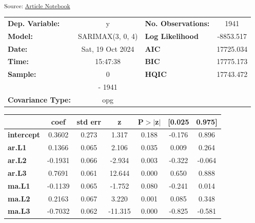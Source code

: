 \documentclass[
  number,
  preprint,
  3p,
  onecolumn]{elsarticle}
\begin{document}
\textsubscript{Source:
\href{https://iancont.github.io/fixed_income_garch/index.qmd.html}{Article
Notebook}}

\begin{center}
\begin{tabular}{lclc}
\toprule
\textbf{Dep. Variable:}          &        y         & \textbf{  No. Observations:  } &    1941     \\
\textbf{Model:}                  & SARIMAX(3, 0, 4) & \textbf{  Log Likelihood     } & -8853.517   \\
\textbf{Date:}                   & Sat, 19 Oct 2024 & \textbf{  AIC                } & 17725.034   \\
\textbf{Time:}                   &     15:47:38     & \textbf{  BIC                } & 17775.173   \\
\textbf{Sample:}                 &        0         & \textbf{  HQIC               } & 17743.472   \\
\textbf{}                        &      - 1941      & \textbf{                     } &             \\
\textbf{Covariance Type:}        &       opg        & \textbf{                     } &             \\
\bottomrule
\end{tabular}
\begin{tabular}{lcccccc}
                   & \textbf{coef} & \textbf{std err} & \textbf{z} & \textbf{P$> |$z$|$} & \textbf{[0.025} & \textbf{0.975]}  \\
\midrule
\textbf{intercept} &       0.3602  &        0.273     &     1.317  &         0.188        &       -0.176    &        0.896     \\
\textbf{ar.L1}     &       0.1366  &        0.065     &     2.106  &         0.035        &        0.009    &        0.264     \\
\textbf{ar.L2}     &      -0.1931  &        0.066     &    -2.934  &         0.003        &       -0.322    &       -0.064     \\
\textbf{ar.L3}     &       0.7691  &        0.061     &    12.644  &         0.000        &        0.650    &        0.888     \\
\textbf{ma.L1}     &      -0.1139  &        0.065     &    -1.752  &         0.080        &       -0.241    &        0.014     \\
\textbf{ma.L2}     &       0.2163  &        0.067     &     3.220  &         0.001        &        0.085    &        0.348     \\
\textbf{ma.L3}     &      -0.7032  &        0.062     &   -11.315  &         0.000        &       -0.825    &       -0.581     \\

\end{tabular}
\end{center}
\end{document}
